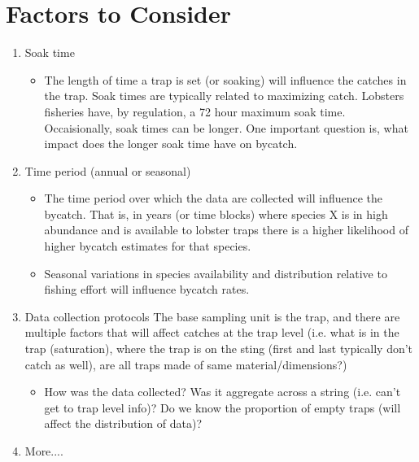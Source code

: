 \documentclass[paper=a4, fontsize=11pt]{scrartcl}	%
\numberwithin{equation}{section}		%
\numberwithin{figure}{section}			%
\numberwithin{table}{section}				%
\begin{document}
\section{Factors to Consider}
\begin{enumerate}
	\item Soak time
		\begin{itemize}
			\item The length of time a trap is set (or soaking) will influence the catches in the trap. Soak times are typically related to maximizing catch. Lobsters fisheries have, by regulation, a 72 hour maximum soak time. Occaisionally, soak times can be longer. One important question is, what impact does the longer soak time have on bycatch. 
		\end{itemize}
		\item Time period (annual or seasonal)
		\begin{itemize}
			\item The time period over which the data are collected will influence the bycatch. That is, in years (or time blocks) where species X is in high abundance and is available to lobster traps there is a higher likelihood of higher bycatch estimates for that species.
			\item Seasonal variations in species availability and distribution relative to fishing effort will influence bycatch rates.
		\end{itemize}
			\item Data collection protocols
			The base sampling unit is the trap, and there are multiple factors that will affect catches at the trap level (i.e. what is in the trap (saturation), where the trap is on the sting (first and last typically don't catch as well), are all traps made of same material/dimensions?)
		\begin{itemize}
			\item How was the data collected? Was it aggregate across a string (i.e. can't get to trap level info)? Do we know the proportion of empty traps (will affect the distribution of data)? 
		\end{itemize}
		\item More....
				
	\end{enumerate}
\end{document}
